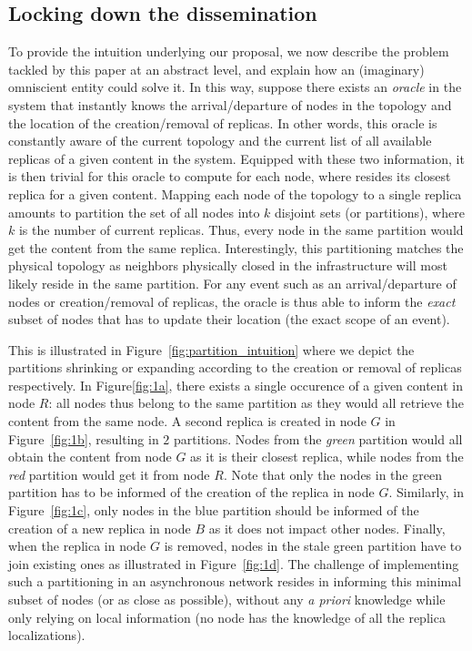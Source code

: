 \subsection*{Locking down the dissemination}
To provide the intuition underlying our proposal, we now describe the problem tackled by this paper at an abstract level, and explain how an (imaginary) omniscient entity could solve it. 
In this way, suppose there exists an \textit{oracle} in the system that instantly knows the arrival/departure of nodes in the topology and the location of the creation/removal of replicas. In other words, this oracle is constantly aware of the current topology and the current list of all available replicas of a given content in the system. Equipped with these two information, it is then trivial for this oracle to compute for each node, where resides its closest replica for a given content. Mapping each node of the topology to a single replica amounts to partition the set of all nodes into $k$ disjoint sets (or partitions), where $k$ is the number of current replicas. Thus, every node in the same partition would get the content from the same replica. Interestingly, this partitioning matches the physical topology as neighbors physically closed in the infrastructure will most likely reside in the same partition.
For any event such as an arrival/departure of nodes or creation/removal of replicas, the oracle is thus able to inform the \textit{exact} subset of nodes that has to update their location (\ie the exact scope of an event). 


This is illustrated in Figure~\ref{fig:partition_intuition} where we depict the partitions shrinking or expanding according to the creation or removal of replicas respectively.
In Figure\ref{fig:1a}, there exists a single occurence of a given content in node $R$: all nodes thus belong to the same partition as they would all retrieve the content from the same node. 
A second replica is created in node $G$ in Figure~\ref{fig:1b}, resulting in $2$ partitions. Nodes from the \textit{green} partition would all obtain the content from node $G$ as it is their closest replica, while nodes from the \textit{red} partition would get it from node $R$.
Note that only the nodes in the green partition has to be informed of the creation of the replica in node $G$. Similarly, in Figure~\ref{fig:1c}, only nodes in the blue partition should be informed of the creation of a new replica in node $B$ as it does not impact other nodes.
Finally, when the replica in node $G$ is removed, nodes in the stale green partition have to join existing ones as illustrated in Figure~\ref{fig:1d}. 
The challenge of implementing such a partitioning in an asynchronous network resides in informing this minimal subset of nodes (or as close as possible), without any \textit{a priori} knowledge while only relying on local information (\ie no node has the knowledge of all the replica localizations).



